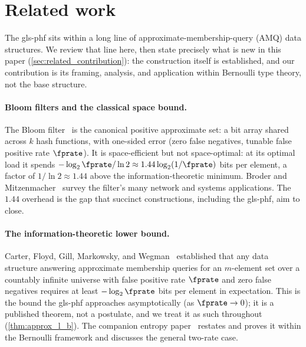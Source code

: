 \documentclass[ ../main.tex]{subfiles}
\begin{document}
\section{Related work}
\label{sec:related}

The \gls{gls-phf} sits within a long line of approximate-membership-query (AMQ) data structures. We review that line here, then state precisely what is new in this paper (\cref{sec:related_contribution}): the construction itself is established, and our contribution is its framing, analysis, and application within Bernoulli type theory, not the base structure.

\paragraph{Bloom filters and the classical space bound.}
The Bloom filter~\cite{bloom1970} is the canonical positive approximate set: a bit array shared across $k$ hash functions, with one-sided error (zero false negatives, tunable false positive rate $\fprate$). It is space-efficient but not space-optimal: at its optimal load it spends $-\log_2 \fprate / \ln 2 \approx 1.44 \log_2(1/\fprate)$ bits per element, a factor of $1/\ln 2 \approx 1.44$ above the information-theoretic minimum. Broder and Mitzenmacher~\cite{bf} survey the filter's many network and systems applications. The $1.44$ overhead is the gap that succinct constructions, including the \gls{gls-phf}, aim to close.

\paragraph{The information-theoretic lower bound.}
Carter, Floyd, Gill, Markowsky, and Wegman~\cite{carter1978} established that any data structure answering approximate membership queries for an $m$-element set over a countably infinite universe with false positive rate $\fprate$ and zero false negatives requires at least $-\log_2 \fprate$ bits per element in expectation. This is the bound the \gls{gls-phf} approaches asymptotically (as $\fprate \to 0$); it is a published theorem, not a postulate, and we treat it as such throughout (\cref{thm:approx_l_b}). The companion entropy paper~\cite{emaps} restates and proves it within the Bernoulli framework and discusses the general two-rate case.
\end{document}
